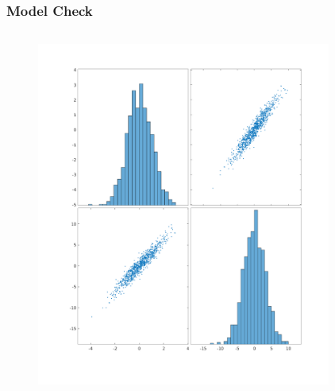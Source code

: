 \documentclass[aspectratio=169,10pt,t]{beamer}
\begin{document}
\begin{frame}[t]
    \frametitle{Model Check}

    \begin{columns}
        \begin{column}{0.5\textwidth}
            \begin{figure}[H]
                \includegraphics[scale=0.2]{images/scatterplotCorr.png}
            \end{figure} 
        \end{column}
        \begin{column}{0.5\textwidth}
            \begin{figure}[H]

\end{figure}
\end{column}
\end{columns}
\end{frame}
\end{document}
